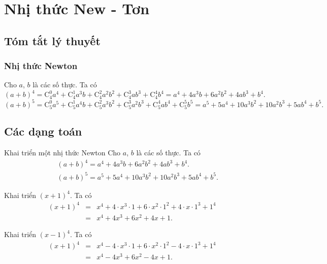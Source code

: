 ﻿\section{Nhị thức New - Tơn}
\subsection{Tóm tắt lý thuyết}
\subsubsection{Nhị thức Newton}
Cho $a$, $b$ là các số thực. Ta có 
$$(a+b)^4=\mathrm{C}_4^0a^4+\mathrm{C}_4^1a^{3}b+\mathrm{C}_4^2a^{2}b^2 +\mathrm{C}_4^{3}ab^{3}+\mathrm{C}_4^4b^4 = a^4+4a^3b+6a^2b^2+4ab^3+b^4.$$
$$(a+b)^5=\mathrm{C}_5^0a^5+\mathrm{C}_5^1a^{4}b+\mathrm{C}_5^2a^{3}b^2 +\mathrm{C}_5^{3}a^2b^{3}+\mathrm{C}_5^4ab^4+\mathrm{C}_5^5b^5 = a^5+5a^4+10a^3b^2+10a^2b^3+5ab^4+b^5.$$
	\subsection{Các dạng toán}	
\begin{dang}{Khai triển một nhị thức Newton}
	Cho $a$, $b$ là các số thực. Ta có 
	\begin{eqnarray*}
		&&(a+b)^4=a^4+4a^3b+6a^2b^2+4ab^3+b^4.\\&&(a+b)^5=a^5+5a^4+10a^3b^2+10a^2b^3+5ab^4+b^5.
	\end{eqnarray*}
\end{dang}
\viduminhhoa
\begin{vd}%
	Khai triển $(x+1)^4$.
	\loigiai
	{
		Ta có
		\begin{eqnarray*}
			(x+1)^4&=&x^4+4\cdot x^{3}\cdot 1+6\cdot x^{2}\cdot 1^2+4\cdot x\cdot 1^3+ 1^4\\&=&x^4+4x^3+6x^2+4x+1.
		\end{eqnarray*}
	}
\end{vd}

\begin{vd}%
	Khai triển $(x-1)^4$.
	\loigiai
	{
		Ta có
		\begin{eqnarray*}
			(x+1)^4&=&x^4-4\cdot x^{3}\cdot 1+6\cdot x^{2}\cdot 1^2-4\cdot x\cdot 1^3+ 1^4\\&=&x^4-4x^3+6x^2-4x+1.
		\end{eqnarray*}
	}
\end{vd}

